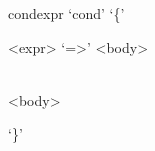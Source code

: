 \documentclass[convert={outext=.png}]{standalone}
\begin{document}
\begin{málrit}{condexpr}
	`cond' `\{'
	\begin{repnull}
		<expr> `=>' <body>
	\end{repnull}
	\begin{stack}\\
		<body>
	\end{stack}
	 `\}'
\end{málrit}
\end{document}
